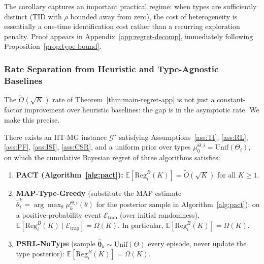 The corollary captures an important practical regime: when types are sufficiently distinct (TID with $\rho$ bounded away from zero), the cost of heterogeneity is essentially a one-time identification cost rather than a recurring exploration penalty. Proof appears in Appendix~\ref{app:regret-decomp}, immediately following Proposition~\ref{prop:type-bound}.

\subsubsection{Rate Separation from Heuristic and Type-Agnostic Baselines}
\label{sec:rate-separation}

The $\tilde{O}(\sqrt{K})$ rate of Theorem~\ref{thm:main-regret-app} is not just a constant-factor improvement over heuristic baselines: the gap is in the asymptotic rate. We make this precise.

\begin{theorem}
\label{thm:rate-separation}
There exists an HT-MG instance $\mathcal{G}^\star$ satisfying Assumptions~\ref{ass:TI}, \ref{ass:RL}, \ref{ass:PF}, \ref{ass:ISI}, \ref{ass:CSR}, and a uniform prior over types $\mu_0^{\Theta,i} = \mathrm{Unif}(\Theta_i)$, on which the cumulative Bayesian regret of three algorithms satisfies:
\begin{enumerate}
\item[(i)] \textbf{PACT (Algorithm~\ref{alg:pact}):} $\mathbb{E}[\mathrm{Reg}_i^B(K)] = \tilde{O}(\sqrt{K})$ for all $K \geq 1$.
\item[(ii)] \textbf{MAP-Type-Greedy} (substitute the MAP estimate $\hat{\theta}_i^k = \arg\max_\theta \mu_k^{\Theta,i}(\theta)$ for the posterior sample in Algorithm~\ref{alg:pact}): on a positive-probability event $\mathcal{E}_{\mathrm{trap}}$ (over initial randomness), $\mathbb{E}[\mathrm{Reg}_i^B(K) \mid \mathcal{E}_{\mathrm{trap}}] = \Omega(K)$. In particular, $\mathbb{E}[\mathrm{Reg}_i^B(K)] = \Omega(K)$.
\item[(iii)] \textbf{PSRL-NoType} (sample $\hat{\boldsymbol{\theta}}_k \sim \mathrm{Unif}(\Theta)$ every episode, never update the type posterior): $\mathbb{E}[\mathrm{Reg}_i^B(K)] = \Omega(K)$.
\end{enumerate}
\end{theorem}

